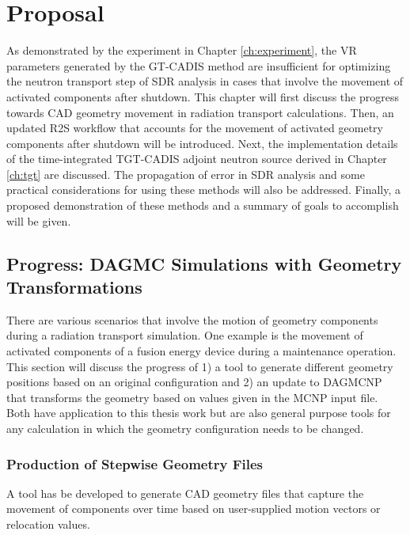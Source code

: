 
\chapter{Proposal}\label{ch:proposal}

As demonstrated by the experiment in Chapter \ref{ch:experiment},  the VR
parameters generated by the GT-CADIS method are insufficient for
optimizing the neutron transport step of SDR analysis in cases that involve the movement 
of activated components after shutdown.  
This chapter will first discuss the progress towards CAD geometry movement in 
radiation transport calculations.
Then, an updated R2S workflow that accounts for the movement of
activated geometry components after shutdown will be introduced.
Next, the implementation details of the time-integrated TGT-CADIS adjoint
neutron source derived in Chapter \ref{ch:tgt} are discussed.
The propagation of error
in SDR analysis and some practical considerations for
using these methods will also be addressed. 
Finally, a proposed demonstration of these methods and a
summary of goals to accomplish will be given.

\section{Progress: DAGMC Simulations with Geometry Transformations}\label{sec:dagmc_trans}
There are various scenarios that involve the motion of geometry components 
during a radiation transport simulation.  One example is the movement of
activated components of a fusion energy device during a maintenance operation.
This section will discuss the progress of 1) a tool to generate different 
geometry positions based on an original configuration and
2) an update to DAGMCNP that transforms the geometry based on values given in 
the MCNP input file.  Both have application to this thesis work but are also 
general purpose tools for any calculation in which the geometry configuration 
needs to be changed.

\subsection{Production of Stepwise Geometry Files}\label{sec:timestep_geoms}
A tool has be developed to generate CAD geometry files that capture the 
movement of components over time based on user-supplied motion vectors or 
relocation values.  

